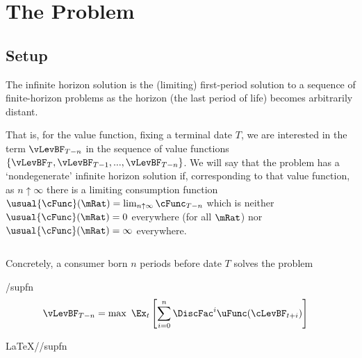 \documentclass[BufferStockTheory]{subfiles}
\providecommand{\LtxDir}{LaTeX/}
\begin{document}
\hypertarget{The-Problem}{}
\section{The Problem}

\subsection{Setup}\label{subsec:Setup}\label{subsec:setup}

The infinite horizon solution is the (limiting) first-period solution to a sequence of finite-horizon problems as the horizon (the last period of life) becomes arbitrarily distant.

That is, for the value function, fixing a terminal date $T$,  we are interested in the term $\vLevBF_{T-n}$ in the sequence of value functions $\{\vLevBF_{T},\vLevBF_{T-1},...,\vLevBF_{T-n}\}$.  We will say that the problem has a `nondegenerate' infinite horizon solution if, corresponding to that value function, as $n \uparrow \infty$ there is a limiting consumption function $\usual{\cFunc}(\mRat) = \lim_{n \uparrow \infty} \cFunc_{T-n}$ which is neither $\usual{\cFunc}(\mRat)=0$ everywhere (for all $\mRat$) nor $\usual{\cFunc}(\mRat)=\infty$ everywhere.

\clearpage\vfill\eject
\begin{equation*}
  \label{eq:Dummy}
\end{equation*}

\onlyinsubfile{}

Concretely, a consumer born $n$ periods before date $T$ solves the problem
\begin{verbatimwrite}{\EqDir/supfn}
  \begin{align*}%
    \vLevBF_{T-n} & = \max~ \Ex_{t}\left[\sum_{i=0}^{n} \DiscFac^{i} \uFunc(\cLevBF_{t+i})\right]
  \end{align*}
\end{verbatimwrite}

\LtxDir\EqDir/supfn


\end{document}

